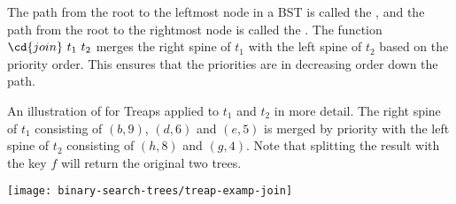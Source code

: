 \begin{chapter}
The path from the root to the leftmost node in a BST is called the
, and the path from the root to the rightmost node is
called the .  The function $\cd{join}~t_1~t_2$
merges the right spine of $t_1$ with the left spine of $t_2$ based on
the priority order.  This ensures that the priorities are in
decreasing order down the path.
\begin{example}
  An illustration of  for Treaps applied to $t_1$ and $t_2$ in
  more detail.  The right spine of $t_1$ consisting of $(b,9)$,
  $(d,6)$ and $(e,5)$ is merged by priority with the left spine of
  $t_2$ consisting of $(h,8)$ and $(g,4)$.  Note that splitting the
  result with the key $f$ will return the original two trees.
\begin{center}
  \texttt{[image: binary-search-trees/treap-examp-join]}
\end{center}
\end{example}



\begin{comment}
\begin{lemma}
\label{thm:treapuniqueness}
  For a set of keys $S$, if their priorities $p(s) : s \in S$ are unique,
  then there is exactly one Treap (i.e. shape) for $S$.

\begin{proof} (By induction on size)
An empty tree is a leaf (base case).  Otherwise, the unique key $k$
with the highest priority in $S$ must be at the root.  This fixes the
keys to the left ($\csetf{k' \in S}{k' < k}$) and to the right
($\csetf{k' \in S}{k' > k}$).  By induction these are unique, so the
whole tree is unique.
\end{proof}
\end{lemma}
\end{comment}


\end{chapter}
